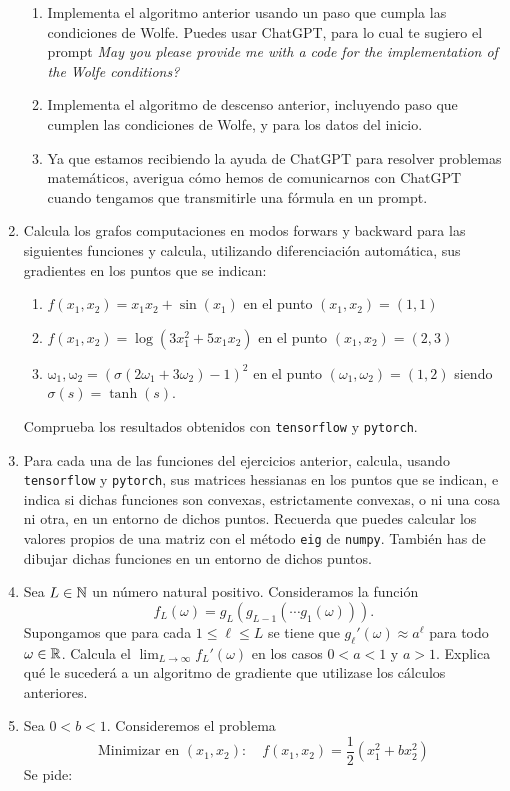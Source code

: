\begin{enumerate}
\begin{enumerate}[label=\arabic*)]
		\item Implementa el algoritmo anterior usando un paso que cumpla las condiciones de Wolfe. Puedes usar ChatGPT, para lo cual te sugiero el prompt \textit{May you please provide me with a code for the implementation of the Wolfe conditions?}
		\item Implementa el algoritmo de descenso anterior, incluyendo paso que cumplen las condiciones de Wolfe, y para los datos del inicio.
		\item Ya que estamos recibiendo la ayuda de ChatGPT para resolver problemas matemáticos, averigua cómo hemos de comunicarnos con ChatGPT cuando tengamos que transmitirle una fórmula en un prompt.
	\end{enumerate}
	\newpage
	\item Calcula los grafos computaciones en modos forwars y backward para las siguientes funciones y calcula, utilizando diferenciación automática, sus gradientes en los puntos que se indican:
	\begin{enumerate}[label=\alph*)]
		\item $f(x_1,x_2)=x_1x_2+\sin(x_1)$ en el punto $(x_1,x_2)=(1,1)$
		\item $f(x_1,x_2)=\log(3x_1^2+5x_1x_2)$ en el punto $(x_1,x_2)=(2,3)$
		\item $\mathrm{\omega_1,\omega_2}=(\sigma(2\omega_1+3\omega_2)-1)^2$ en el punto $(\omega_1,\omega_2)=(1,2)$ siendo $\sigma(s)=\tanh(s)$.
	\end{enumerate}
	Comprueba los resultados obtenidos con \texttt{tensorflow} y \texttt{pytorch}.
	\item Para cada una de las funciones del ejercicios anterior, calcula, usando \texttt{tensorflow} y \texttt{pytorch}, sus matrices hessianas en los puntos que se indican, e indica si dichas funciones son convexas, estrictamente convexas, o ni una cosa ni otra, en un entorno de dichos puntos. Recuerda que puedes calcular los valores propios de una matriz con el método \texttt{eig} de \texttt{numpy}. También has de dibujar dichas funciones en un entorno de dichos puntos.
	\item Sea $L\in\operatorname{\mathbb{N}}$ un número natural positivo. Consideramos la función \[ f_L(\omega)=g_L(g_{L-1}(\cdots g_1(\omega))). \] Supongamos que para cada $1\le\ell\le L$ se tiene que $g_\ell'(\omega)\approx a^\ell$ para todo $\omega\in\operatorname{\mathbb{R}}$. Calcula el $\lim_{L\to\infty}f_L'(\omega)$ en los casos $0<a<1$ y $a>1$. Explica qué le sucederá a un algoritmo de gradiente que utilizase los cálculos anteriores.
	\item Sea $0<b<1$. Consideremos el problema \[ \text{Minimizar en }(x_1,x_2):\quad f(x_1,x_2)=\dfrac{1}{2}(x_1^2+bx_2^2) \]Se pide:

\end{enumerate}
